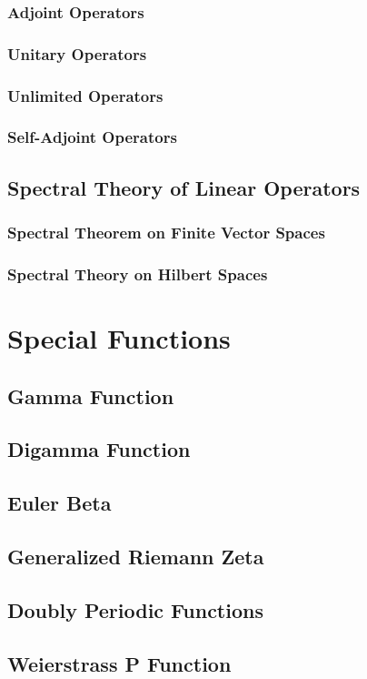 \documentclass{book}
\begin{document}
\subsection{Adjoint Operators}
\subsection{Unitary Operators}
\subsection{Unlimited Operators}
\subsection{Self-Adjoint Operators}
\section{Spectral Theory of Linear Operators}
\subsection{Spectral Theorem on Finite Vector Spaces}
\subsection{Spectral Theory on Hilbert Spaces}
\chapter{Special Functions}
\section{Gamma Function}
\section{Digamma Function}
\section{Euler Beta}
\section{Generalized Riemann Zeta}
\section{Doubly Periodic Functions}
\section{Weierstrass P Function}
\end{document}
